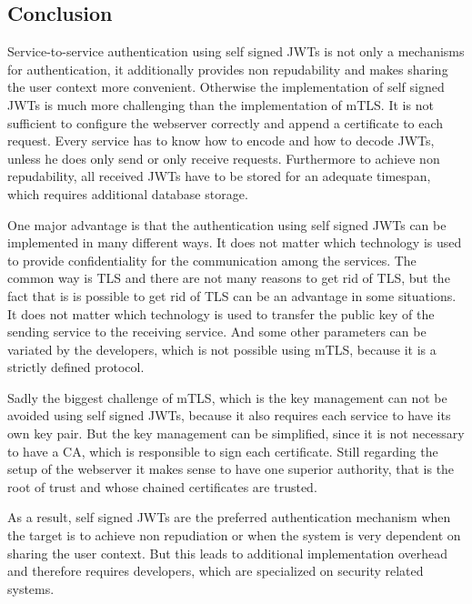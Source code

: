 \subsection{Conclusion}
Service-to-service authentication using self signed JWTs is not only a mechanisms for authentication, it additionally provides non repudability and makes sharing the user context more convenient. 
Otherwise the implementation of self signed JWTs is much more challenging than the implementation of mTLS.
It is not sufficient to configure the webserver correctly and append a certificate to each request.
Every service has to know how to encode and how to decode JWTs, unless he does only send or only receive requests.
Furthermore to achieve non repudability, all received JWTs have to be stored for an adequate timespan, which requires additional database storage.

One major advantage is that the authentication using self signed JWTs can be implemented in many different ways.
It does not matter which technology is used to provide confidentiality for the communication among the services.
The common way is TLS and there are not many reasons to get rid of TLS, but the fact that is is possible to get rid of TLS can be an advantage in some situations.
It does not matter which technology is used to transfer the public key of the sending service to the receiving service.
And some other parameters can be variated by the developers, which is not possible using mTLS, because it is a strictly defined protocol.

Sadly the biggest challenge of mTLS, which is the key management can not be avoided using self signed JWTs, because it also requires each service to have its own key pair.
But the key management can be simplified, since it is not necessary to have a CA, which is responsible to sign each certificate.
Still regarding the setup of the webserver it makes sense to have one superior authority, that is the root of trust and whose chained certificates are trusted.

As a result, self signed JWTs are the preferred authentication mechanism when the target is to achieve non repudiation or when the system is very dependent on sharing the user context.
But this leads to additional implementation overhead and therefore requires developers, which are specialized on security related systems.

